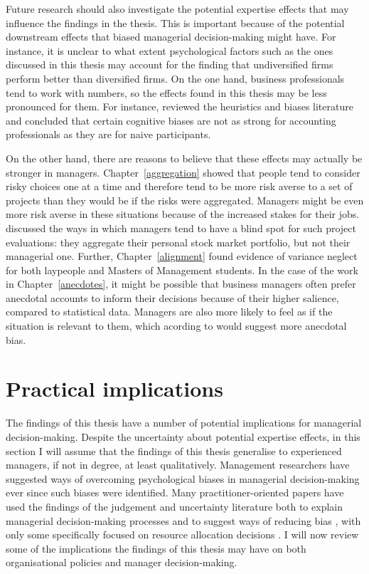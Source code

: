 \documentclass[a4paper, nobind, dvipsnames]{templates/ociamthesis}
\theoremstyle{definition}
\theoremstyle{definition}
\theoremstyle{definition}
\theoremstyle{definition}
\theoremstyle{remark}
\begin{document}
Future research should also investigate the potential expertise effects that may
influence the findings in the thesis. This is important because of the potential
downstream effects that biased managerial decision-making might have. For
instance, it is unclear to what extent psychological factors such as the ones
discussed in this thesis may account for the finding that undiversified firms
perform better than diversified firms. On the one hand, business professionals
tend to work with numbers, so the effects found in this thesis may be less
pronounced for them. For instance, \textcite{smith1991} reviewed the heuristics and biases
literature and concluded that certain cognitive biases are not as strong for
accounting professionals as they are for naive participants.

On the other hand, there are reasons to believe that these effects may actually
be stronger in managers. Chapter~\ref{aggregation} showed that people tend to
consider risky choices one at a time and therefore tend to be more risk averse
to a set of projects than they would be if the risks were aggregated. Managers
might be even more risk averse in these situations because of the increased
stakes for their jobs. \textcite{lovallo2020} discussed the ways in which managers tend to
have a blind spot for such project evaluations: they aggregate their personal
stock market portfolio, but not their managerial one. Further,
Chapter~\ref{alignment} found evidence of variance neglect for both laypeople
and Masters of Management students. In the case of the work in
Chapter~\ref{anecdotes}, it might be possible that business managers often
prefer anecdotal accounts to inform their decisions because of their higher
salience, compared to statistical data. Managers are also more likely to feel as
if the situation is relevant to them, which acording to \textcite{freling2020} would
suggest more anecdotal bias.

\hypertarget{practical-implications-2}{%
\section{Practical implications}\label{practical-implications-2}}

The findings of this thesis have a number of potential implications for
managerial decision-making. Despite the uncertainty about potential expertise
effects, in this section I will assume that the findings of this thesis
generalise to experienced managers, if not in degree, at least qualitatively.
Management researchers have suggested ways of overcoming psychological biases in
managerial decision-making ever since such biases were identified. Many
practitioner-oriented papers have used the findings of the judgement and
uncertainty literature both to explain managerial decision-making processes and
to suggest ways of reducing bias \autocite{lovallo2014,koller2012,hall2012,courtney1997,courtney2013,sibony2017}, with only some specifically focused
on resource allocation decisions \autocite{birshan2013}. I will now review some of the
implications the findings of this thesis may have on both organisational
policies and manager decision-making.
\end{document}
